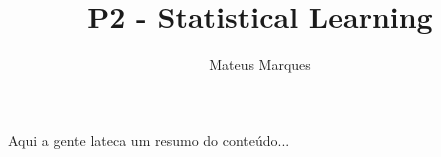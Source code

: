 \documentclass[a4paper,fleqn,12pt]{article}
\title{\Huge{\textbf{P2 - Statistical Learning}}}
\author{Mateus Marques}
\begin{document}
\maketitle

Aqui a gente lateca um resumo do conteúdo...
\end{document}
